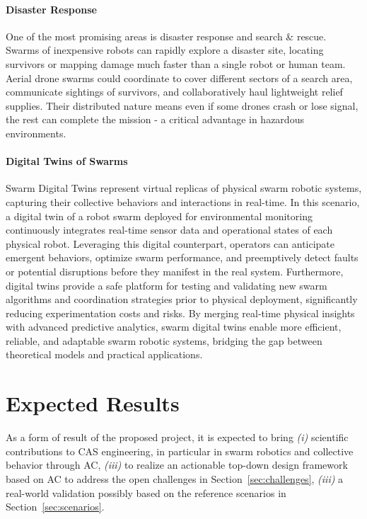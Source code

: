 \documentclass[12pt]{article}
\begin{document}
\paragraph{Disaster Response} One of the most promising areas is disaster response and search & rescue. Swarms of inexpensive robots can rapidly explore a disaster site, 
locating survivors or mapping damage much faster than a single robot or human team. 
Aerial drone swarms could coordinate to cover different sectors of a search area, communicate sightings of survivors, and collaboratively haul lightweight relief supplies. Their distributed nature means even if some drones crash or lose signal, the rest can complete the mission - a critical advantage in hazardous environments.



\paragraph{Digital Twins of Swarms}
Swarm Digital Twins represent virtual replicas of physical swarm robotic systems, capturing their collective behaviors and interactions in real-time. 
In this scenario, a digital twin of a robot swarm deployed for environmental monitoring continuously integrates real-time sensor data and operational states of each physical robot. 
Leveraging this digital counterpart, operators can anticipate emergent behaviors, optimize swarm performance, and preemptively detect faults or potential disruptions before they manifest in the real system. 
Furthermore, digital twins provide a safe platform for testing and validating new swarm algorithms and coordination strategies prior to physical deployment, significantly reducing experimentation costs and risks. 
By merging real-time physical insights with advanced predictive analytics, swarm digital twins enable more efficient, reliable, and adaptable swarm robotic systems, bridging the gap between theoretical models and practical applications.

\section{Expected Results}
As a form of result of the proposed project, it is expected to bring \textit{(i)} scientific contributions to CAS engineering, in particular in swarm robotics and collective behavior through AC,
\textit{(iii)} to realize an actionable top-down design framework based on AC to address the open challenges in Section~\ref{sec:challenges}, \textit{(iii)} a real-world validation possibly based on the reference scenarios in Section~\ref{sec:scenarios}.
\end{document}
